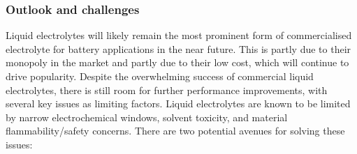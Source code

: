 \documentclass[../main.tex]{subfiles}
\begin{document}
\subsubsection{Outlook and challenges}
\label{sec:liquids_outlook}
Liquid electrolytes will likely remain the most prominent form of commercialised electrolyte for battery applications in the near future. This is partly due to their monopoly in the market and partly due to their low cost, which will continue to drive popularity. Despite the overwhelming success of commercial liquid electrolytes, there is still room for further performance improvements, with several key issues as limiting factors. Liquid electrolytes are known to be limited by narrow electrochemical windows, solvent toxicity, and material flammability/safety concerns. There are two potential avenues for solving these issues:
\end{document}
